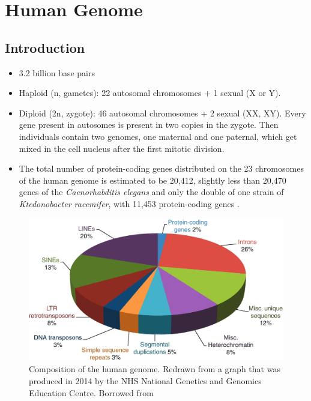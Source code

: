 \chapter{Human Genome}\label{chp:human_genome}

\minitoc

\section{Introduction}
\begin{itemize}
    \item 3.2 billion base pairs 
    \item Haploid (n, gametes): 22 autosomal chromosomes + 1 sexual (X or Y).
    \item Diploid (2n, zygote): 46 autosomal chromosomes + 2 sexual (XX, XY). Every gene present in autosomes is present 
    in two copies in the zygote. Then individuals contain two genomes, one maternal and one paternal, which get mixed in 
    the cell nucleus after the first mitotic division.
    \item The total number of protein-coding genes distributed on the 23 chromosomes of the human genome is estimated to 
    be 20,412, slightly less than 20,470 genes of the \textit{Caenorhabditis elegans} \cite{Pena2021} and only the double of one strain of 
    \textit{Ktedonobacter racemifer}, with 11,453 protein-coding genes \cite{He2024}.
\end{itemize}
\begin{figure}[!ht]
    \centering
    \includegraphics[width=1\linewidth]{./figure/composition_human_genome.png}
    \caption{Composition of the human genome. Redrawn from a graph that was produced in 2014 by the NHS National Genetics 
    and Genomics Education Centre. Borrowed from  \cite{Pena2021}}
    \label{fig:composition_human_genome}
\end{figure}

